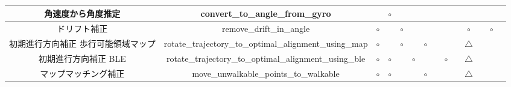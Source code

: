 \begin{table}[ht]
{\begin{tabular}{|c|c|c|c|c|c|c|c|c|c|c|c|c|c|}
			角速度から角度推定       & convert\_to\_angle\_from\_gyro                                      &                              & \multicolumn{1}{c|}{$\circ$} &                              &                              &                              &                                                                                                               &                              &                                  &                                  &    &                              &    \\ \hline
			ドリフト補正          & remove\_drift\_in\_angle                                            & \multicolumn{1}{c|}{$\circ$} &                              & \multicolumn{1}{c|}{$\circ$} &                              &                              &                                                                                                               &                              &                                  & \multicolumn{1}{c|}{$\circ$}     &    & \multicolumn{1}{c|}{$\circ$} &    \\ \hline
			初期進行方向補正 歩行可能領域マップ & rotate\_trajectory\_to\_optimal\_alignment\_using\_map              & \multicolumn{1}{c|}{$\circ$} &                              & \multicolumn{1}{c|}{$\circ$} &                              & \multicolumn{1}{c|}{$\circ$} &                                                                                                               &                              &                                  & \multicolumn{1}{c|}{$\triangle$} &    &                              &    \\ \hline
			初期進行方向補正 BLE    & rotate\_trajectory\_to\_optimal\_alignment\_using\_ble              & \multicolumn{1}{c|}{$\circ$} & \multicolumn{1}{c|}{$\circ$} &                              & \multicolumn{1}{c|}{$\circ$} &                              &                                                                                                               & \multicolumn{1}{c|}{$\circ$} &                                  & \multicolumn{1}{c|}{$\triangle$} &    &                              &    \\ \hline
			マップマッチング補正      & move\_unwalkable\_points\_to\_walkable                              & \multicolumn{1}{c|}{$\circ$} & \multicolumn{1}{c|}{$\circ$} &                              &                              & \multicolumn{1}{c|}{$\circ$} &                                                                                                               &                              &                                  & \multicolumn{1}{c|}{$\triangle$} &    &                              &    \\ \hline

\end{tabular}}
\end{table}
